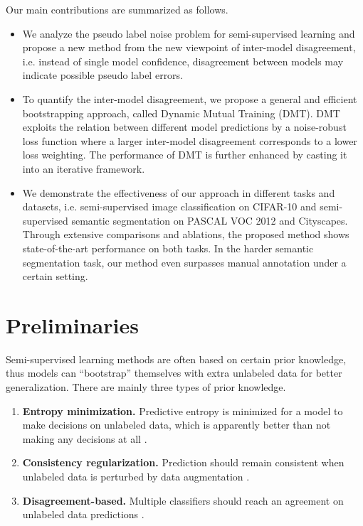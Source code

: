 \documentclass[preprint,review,10pt]{elsarticle}
\begin{document}
Our main contributions are summarized as follows.
\begin{itemize}
    \item We analyze the pseudo label noise problem for semi-supervised learning and propose a new method from the new viewpoint of inter-model disagreement, i.e. instead of single model confidence, disagreement between models may indicate possible pseudo label errors.
    \item To quantify the inter-model disagreement, we propose a general and efficient bootstrapping approach, called Dynamic Mutual Training (DMT). DMT exploits the relation between different model predictions by a noise-robust loss function where a larger inter-model disagreement corresponds to a lower loss weighting. The performance of DMT is further enhanced by casting it into an iterative framework.
    \item We demonstrate the effectiveness of our approach in different tasks and datasets, i.e. semi-supervised image classification on CIFAR-10 and semi-supervised semantic segmentation on PASCAL VOC 2012 and Cityscapes. Through extensive comparisons and ablations, the proposed method shows state-of-the-art performance on both tasks. In the harder semantic segmentation task, our method even surpasses manual annotation under a certain setting.
\end{itemize}




\section{Preliminaries}
\label{sec:2}

Semi-supervised learning methods are often based on certain prior knowledge, thus models can ``bootstrap'' themselves with extra unlabeled data for better generalization. There are mainly three types of prior knowledge.

\begin{enumerate}
    \item \textbf{Entropy minimization.} Predictive entropy is minimized for a model to make decisions on unlabeled data, which is apparently better than not making any decisions at all \cite{grandvalet2005semi}.
    \item \textbf{Consistency regularization.} Prediction should remain consistent when unlabeled data is perturbed by data augmentation \cite{tarvainen2017mean}.
    \item \textbf{Disagreement-based.} Multiple classifiers should reach an agreement on unlabeled data predictions \cite{qiao2018deep}.
\end{enumerate}
\end{document}
